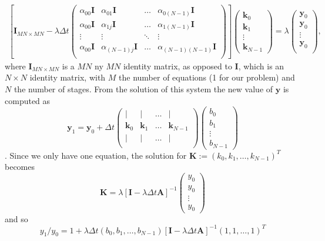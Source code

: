 \documentclass[10pt,a4paper]{article}
\newcommand{\bvec}[1]{\mathbf{#1}}
\begin{document}
\begin{align*}
  \left[ \bvec{I}_{MN\times MN} - \lambda \Delta t \begin{pmatrix}
    \alpha_{00}\bvec{I} &\alpha_{01}\bvec{I} &\hdots &\alpha_{0(N-1)}\bvec{I} \\
    \alpha_{00}\bvec{I} &\alpha_{1j}\bvec{I} &\hdots &\alpha_{1(N-1)}\bvec{I} \\
    \vdots & \vdots & \ddots & \vdots \\
    \alpha_{00}\bvec{I} &\alpha_{(N-1)j}\bvec{I} &\hdots &\alpha_{(N-1)(N-1)}\bvec{I} \\
  \end{pmatrix}\right] \begin{pmatrix} \bvec{k}_0 \\
    \bvec{k}_1 \\
    \vdots \\
    \bvec{k}_{N-1}
  \end{pmatrix} = \lambda
  \begin{pmatrix}
    \bvec{y}_0 \\
    \bvec{y}_0 \\
    \vdots \\
    \bvec{y}_0 \\
  \end{pmatrix},
\end{align*}
where $\bvec{I}_{MN\times MN}$ is a $MN$ ny $MN$ identity matrix, as opposed to $\bvec{I}$, which is an $N\times N$ identity matrix, with $M$ the number of equations (1 for our problem) and $N$ the number of stages.
From the solution of this system the new value of $\bvec{y}$ is computed as
\begin{equation*}
  \bvec{y}_1 = \bvec{y}_0 + \Delta t
  \begin{pmatrix}
    \vert & \vert & \hdots & \vert \\
    \bvec{k}_0 & \bvec{k}_1 & \hdots & \bvec{k}_{N-1}\\
        \vert & \vert & \hdots & \vert \\
  \end{pmatrix}\begin{pmatrix}
    b_0 \\
    b_1 \\
    \vdots \\
    b_{N-1}
  \end{pmatrix}
\end{equation*}.
Since we only have one equation, the solution for $\bvec{K} := \left(k_0, k_1, \hdots, k_{N-1}\right)^T$ becomes
\begin{equation*}
  \bvec{K} = \lambda \left[ \bvec{I} - \lambda \Delta t \bvec{A}  \right]^{-1}
  \begin{pmatrix}
    y_0 \\
    y_0 \\
    \vdots \\
    y_0
  \end{pmatrix}
\end{equation*}
and so
\begin{equation*}
  y_1/y_0 = 1 + \lambda \Delta t \left(b_0, b_1, \hdots, b_{N-1}\right)\left[\bvec{I} - \lambda \Delta t \bvec{A}\right]^{-1}\left(1, 1, \hdots, 1\right)^T
\end{equation*}
\end{document}
